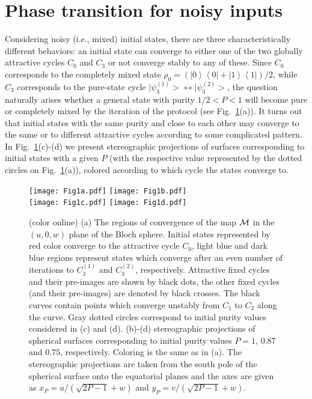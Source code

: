 \documentclass[%
 aip,
 amsmath,amssymb,
 reprint,%
]{revtex4-1}
\begin{document}
\section{Phase transition for noisy inputs} 
Considering noisy (i.e., mixed) initial states, there are three characteristically different behaviors: an initial state can converge to either one of the two globally attractive cycles $C_{0}$ and $C_{3}$ or not converge stably to any of these. 
Since $C_{0}$ corresponds to the completely mixed state $\rho_{0}=(\left|0\right>\left<0\right|+\left|1\right>\left<1\right|)/2$, while $C_{3}$ corresponds to the pure-state cycle $\big|\psi_{3}^{(1)}\big>\leftrightarrow\big|\psi_{3}^{(2)}\big>$, the question naturally arises whether a general state with purity $1/2 < P < 1$ will become pure or completely mixed by the iteration of the protocol (see Fig.~\ref{Fig1}(a)). It turns out that initial states with the same purity and close to each other may converge to the same or to different attractive cycles according to some complicated pattern. In Fig.~\ref{Fig1}(c)-(d) we present stereographic projections of surfaces corresponding to initial states with a given $P$ (with the respective value represented by the dotted circles on Fig.~\ref{Fig1}(a)), colored according to which cycle the states converge to.   


\begin{figure}
\texttt{[image: Fig1a.pdf]}
\texttt{[image: Fig1b.pdf]} \\
\texttt{[image: Fig1c.pdf]}
\texttt{[image: Fig1d.pdf]}
\caption{(color online) (a) The regions of convergence of the map $\cal M$ in the $(u,0,w)$ plane of the Bloch sphere. Initial states represented by red color converge to the attractive cycle $C_{0}$, light blue and dark blue regions represent states which converge after an even number of iterations to $C_{3}^{(1)}$ and $C_{3}^{(2)}$, respectively. Attractive fixed cycles and their pre-images are shown by black dots, the other fixed cycles (and their pre-images) are denoted by black crosses. The black curves contain points which converge unstably from $C_{1}$ to $C_{2}$ along the curve. Gray dotted circles correspond to initial purity values considered in (c) and (d). (b)-(d) stereographic projections  of spherical surfaces corresponding to initial purity values $P=1$, $0.87$ and $0.75$, respectively. Coloring is the same as in (a). The stereographic projections are taken from the south pole of the spherical surface onto the equatorial planes and the axes are given as $x_{P}=u/(\sqrt{2P-1}+w)$ and $y_{P}=v/(\sqrt{2P-1}+w)$.  
}
\label{Fig1}
\end{figure}
\end{document}
